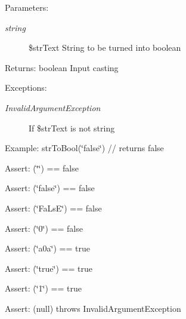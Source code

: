 \begin{Desc}
\item[Parameters:]
\begin{description}
\item[{\em string}]\$strText String to be turned into boolean \end{description}
\end{Desc}
\begin{Desc}
\item[Returns:]boolean Input casting \end{Desc}
\begin{Desc}
\item[Exceptions:]
\begin{description}
\item[{\em InvalidArgumentException}]If \$strText is not string \end{description}
\end{Desc}
\begin{Desc}
\item[Example:]strToBool(\char`\"{}false\char`\"{}) // returns false\end{Desc}
\begin{Desc}
\item[Assert:](\char`\"{}\char`\"{}) == false \end{Desc}
\begin{Desc}
\item[Assert:](\char`\"{}false\char`\"{}) == false \end{Desc}
\begin{Desc}
\item[Assert:](\char`\"{}FaLsE\char`\"{}) == false \end{Desc}
\begin{Desc}
\item[Assert:](\char`\"{}0\char`\"{}) == false\end{Desc}
\begin{Desc}
\item[Assert:](\char`\"{}a0a\char`\"{}) == true \end{Desc}
\begin{Desc}
\item[Assert:](\char`\"{}true\char`\"{}) == true \end{Desc}
\begin{Desc}
\item[Assert:](\char`\"{}1\char`\"{}) == true\end{Desc}
\begin{Desc}
\item[Assert:](null) throws InvalidArgumentException \end{Desc}
